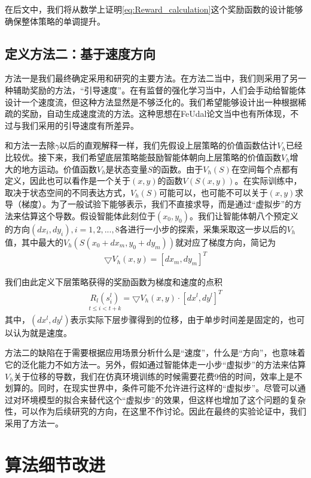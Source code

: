 在后文中，我们将从数学上证明\eqref{eq:Reward_calculation}这个奖励函数的设计能够确保整体策略的单调提升。

\subsection{定义方法二：基于速度方向}
方法一是我们最终确定采用和研究的主要方法。在方法二当中，我们则采用了另一种辅助奖励的方法，``引导速度''。在有监督的强化学习当中，人们会手动给智能体设计一个速度流，但这种方法显然是不够泛化的。我们希望能够设计出一种根据稀疏的奖励，自动生成速度流的方法。这种思想在FeUdal论文\cite{feudal}当中也有所体现，不过与我们采用的引导速度有所差异。

和方法一去除$\gamma$以后的直观解释一样，我们先假设上层策略的价值函数估计$V_h$已经比较优。接下来，我们希望底层策略能鼓励智能体朝向上层策略的价值函数$V_h$增大的地方运动。价值函数$V_h$是状态变量$S$的函数。由于$V_h(S)$在空间每个点都有定义，因此也可以看作是一个关于$(x, y)$的函数$V(S(x, y))$。在实际训练中，取决于状态空间的不同表达方式，$V_h(S)$可能可以，也可能不可以关于$(x, y)$求导（梯度）。为了一般试验下能够表示，我们不直接求导，而是通过``虚拟步''的方法来估算这个导数。假设智能体此刻位于$(x_0, y_0)$。我们让智能体朝八个预定义的方向$(dx_i, dy_i), i = 1,2,...,8$各进行一小步的探索，采集采取这一步以后的$V_h$值，其中最大的$V_h(S(x_0 + dx_m, y_0 + dy_m))$就对应了梯度方向，简记为
\begin{align}
  \bigtriangledown V_h(x, y) = [dx_m, dy_m]^T
\end{align}

我们由此定义下层策略获得的奖励函数为梯度和速度的点积
\begin{align}
  	\underset{t\leq  i < t+k}{R_l(s_i^l)} = \bigtriangledown V_h(x, y) \cdot [dx^l, dy^l]^T
	\label{eq:Reward_calculation2}
\end{align}
其中，$(dx^l, dy^l)$表示实际下层步骤得到的位移，由于单步时间差是固定的，也可以认为就是速度。

方法二的缺陷在于需要根据应用场景分析什么是``速度''，什么是``方向''，也意味着它的泛化能力不如方法一。另外，假如通过智能体走一小步``虚拟步''的方法来估算$V_h$关于位移的导数，我们在仿真环境训练的时候需要花费9倍的时间，效率上是不划算的。同时，在现实世界中，条件可能不允许进行这样的``虚拟步''。尽管可以通过对环境模型的拟合来替代这个``虚拟步''的效果，但这样也增加了这个问题的复杂性，可以作为后续研究的方向，在这里不作讨论。因此在最终的实验论证中，我们采用了方法一。

\section{算法细节改进}
